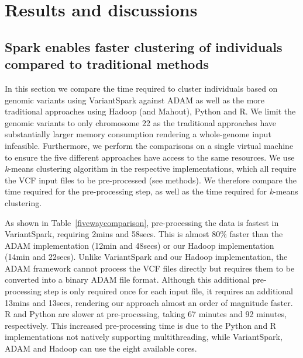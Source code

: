 \documentclass{bmcart}
\newcommand{\variantSpark}{{\sc VariantSpark}}
\newcommand{\kMeans}{\textit{k}-means}
\begin{document}
\section*{Results and discussions}

\subsection*{{\sc Spark} enables faster clustering of individuals compared to traditional methods}

In this section we compare the time required to cluster individuals based on genomic variants using \variantSpark{} against ADAM as well as the more traditional approaches using Hadoop (and Mahout), Python and R. 
We limit the genomic variants to only chromosome 22 as the traditional approaches have substantially larger memory consumption rendering a whole-genome input infeasible.  
Furthermore, we perform the comparisons on a single virtual machine to ensure the five different approaches have access to the same resources.
We use \kMeans{} clustering algorithm in the respective implementations, which all require the VCF input files to be pre-processed (see methods). 
We therefore compare the time required for the pre-processing step, as well as the time required for \kMeans{} clustering.

As shown in Table~\ref{fivewaycomparison}, pre-processing the data is fastest in \variantSpark{}, requiring 2mins and 58secs. %
This is almost 80\% faster than the ADAM implementation (12min and 48secs) %
or our Hadoop implementation (14min and 22secs). %
Unlike \variantSpark{} and our Hadoop implementation, the ADAM framework cannot process the VCF files directly but requires them to be converted into a binary ADAM file format. 
Although this additional pre-processing step is only required once for each input file, it requires an additional 13mins and 13secs, %
rendering our approach almost an order of magnitude faster.
R and Python are slower at pre-processing, taking 67 minutes and 92 minutes, respectively. This increased pre-processing time is due to the Python and R implementations not natively supporting multithreading, while \variantSpark{}, ADAM and Hadoop can use the eight available cores.
\end{document}

